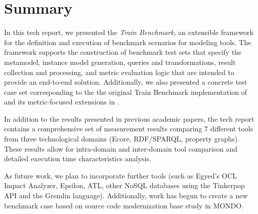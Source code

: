 \chapter{Summary}
\label{cha:summary}

In this tech report, we presented the \emph{Train Benchmark}, an extensible framework for the definition and execution of  benchmark scenarios for modeling tools. The framework supports the construction of benchmark test sets that specify the 
metamodel, instance model generation, queries and transformations, result collection and processing, and metric evaluation logic that are intended to provide an end-to-end solution. Additionally, we also presented a concrete test case set corresponding to the the original Train Benchmark implementation of \cite{SCP2014} and its metric-focused extensions in \cite{ASE2013}.

In addition to the results presented in previous academic papers, the tech report contains a comprehensive set of measurement results comparing 7 different tools from three technological domains (Ecore, RDF/SPARQL, property graphs). These results allow for intra-domain and inter-domain tool comparison and detailed execution time characteristics analysis.

As future work, we plan to incorporate further tools (such as Egyed's OCL Impact Analyzer, Epsilon, ATL, other NoSQL databases using the Tinkerpop API and the Gremlin language). Additionally, work has begun to create a new benchmark case based on source code modernization base study in MONDO.